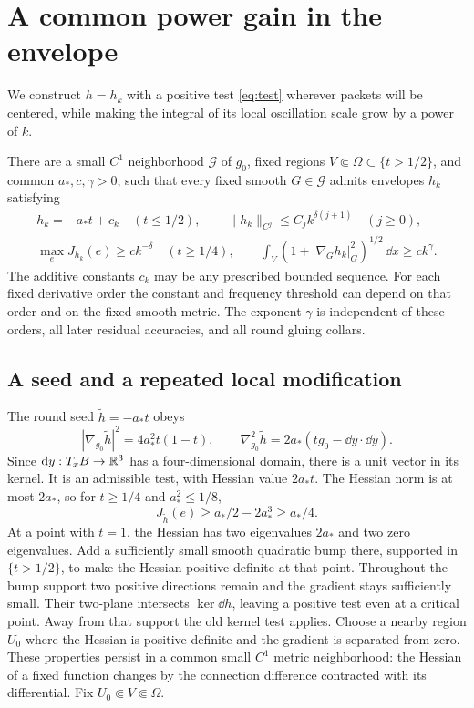 \section{A common power gain in the envelope}\label{sec:envelope}

We construct \(h=h_k\) with a positive test \eqref{eq:test} wherever
packets will be centered, while making the integral of its local
oscillation scale grow by a power of \(k\).

\begin{proposition}\label{prop:envelope}
There are a small \(C^1\) neighborhood \(\mathcal G\) of \(g_0\),
fixed regions \(V\Subset\Omega\subset\{t>1/2\}\), and common
\(a_*,c,\gamma>0\), such that every fixed smooth \(G\in\mathcal G\)
admits envelopes \(h_k\) satisfying
\begin{equation}\label{eq:envelope}
\begin{gathered}
 h_k=-a_*t+c_k\quad(t\le1/2),\qquad
 \|h_k\|_{C^j}\le C_j k^{\delta(j+1)}\quad(j\ge0),\\
 \max_e J_{h_k}(e)\ge c k^{-\delta}\quad(t\ge1/4),\qquad
 \int_V(1+|\nabla_Gh_k|_G^2)^{1/2}\,\dd x\ge c k^\gamma .
\end{gathered}
\end{equation}
The additive constants \(c_k\) may be any prescribed bounded sequence.
For each fixed derivative order the constant and frequency threshold
can depend on that order and on the fixed smooth metric.
The exponent \(\gamma\) is independent of these orders, all later
residual accuracies, and all round gluing collars.
\end{proposition}

\subsection{A seed and a repeated local modification}

The round seed \(\widetilde h=-a_*t\) obeys
\[
 |\nabla_{g_0}\widetilde h|^2=4a_*^2t(1-t),\qquad
 \nabla_{g_0}^2\widetilde h=2a_*(tg_0-\dd y\cdot\dd y).
\]
Since \(\mathrm d y:T_xB\to\mathbb R^3\) has a four-dimensional domain, there
is a unit vector in its kernel. It is an admissible test, with Hessian
value \(2a_*t\). The Hessian norm is at most \(2a_*\), so for
\(t\ge1/4\) and \(a_*^2\le1/8\),
\[
 J_{\widetilde h}(e)\ge a_*/2-2a_*^3\ge a_*/4.
\]
At a point with \(t=1\), the Hessian has two eigenvalues \(2a_*\)
and two zero eigenvalues. Add a sufficiently small smooth quadratic
bump there, supported in \(\{t>1/2\}\), to make the Hessian positive
definite at that point. Throughout the bump support two positive
directions remain and the gradient stays sufficiently small. Their
two-plane intersects \(\ker\dd h\), leaving a positive test even at
a critical point. Away from that support the old kernel test applies.
Choose a nearby region \(U_0\) where the Hessian is positive definite
and the gradient is separated from zero. These properties persist in
a common small \(C^1\) metric neighborhood: the Hessian of a fixed
function changes by the connection difference contracted with its
differential. Fix \(U_0\Subset V\Subset\Omega\).


